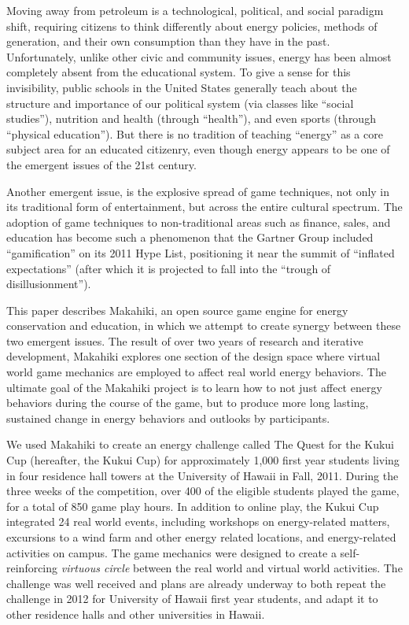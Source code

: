 \documentclass{acm_proc_article-sp}
\begin{document}
Moving away from petroleum is a technological, political, and social paradigm
shift, requiring citizens to think differently about energy policies, methods
of generation, and their own consumption than they have in the past.
Unfortunately, unlike other civic and community issues, energy has been almost
completely absent from the educational system. To give a sense for this
invisibility, public schools in the United States generally teach about the
structure and importance of our political system (via classes like ``social
studies''), nutrition and health (through ``health''), and even sports (through
``physical education'').  But there is no tradition of teaching ``energy'' as a
core subject area for an educated citizenry, even though energy appears to be
one of the emergent issues of the 21st century.

Another emergent issue, is the explosive spread of game techniques, not only in
its traditional form of entertainment, but across the entire cultural spectrum.
The adoption of game techniques to non-traditional areas such as finance,
sales, and education has become such a phenomenon that the Gartner Group
included ``gamification'' \cite{Deterding2011mt} on its 2011 Hype List,
positioning it near the summit of ``inflated expectations'' (after which it is
projected to fall into the ``trough of disillusionment'').

This paper describes Makahiki, an open source game engine for energy
conservation and education, in which we attempt to create synergy between
these two emergent issues.  The result of over two years of research and
iterative development, Makahiki explores one section of the design space
where virtual world game mechanics are employed to affect real world energy
behaviors.  The ultimate goal of the Makahiki project is to learn how to
not just affect energy behaviors during the course of the game, but to
produce more long lasting, sustained change in energy behaviors and
outlooks by participants. 

We used Makahiki to create an energy challenge called The Quest for the Kukui
Cup (hereafter, the Kukui Cup) for approximately 1,000 first year students
living in four residence hall towers at the University of Hawaii in Fall, 2011.
During the three weeks of the competition, over 400 of the eligible students
played the game, for a total of 850 game play hours.  In addition to online
play, the Kukui Cup integrated 24 real world events, including workshops on
energy-related matters, excursions to a wind farm and other energy related
locations, and energy-related activities on campus. The game mechanics were
designed to create a self-reinforcing \emph{virtuous circle} between the real
world and virtual world activities.  The challenge was well received and plans
are already underway to both repeat the challenge in 2012 for University of
Hawaii first year students, and adapt it to other residence halls and other
universities in Hawaii.
\end{document}
